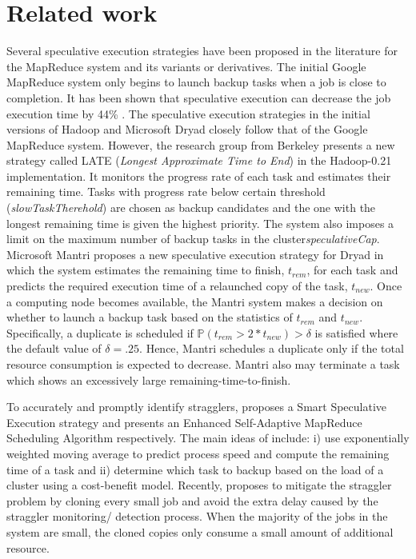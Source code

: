 \documentclass[10pt,conference]{IEEEtran}
\begin{document}
\section{Related work}
\label{related_work}
Several speculative execution strategies have been proposed in the literature for the MapReduce system and its variants or derivatives. The initial Google MapReduce system only begins to launch backup tasks  when a job is close to completion. It has been shown that speculative execution can decrease the job execution time by 44\% {\cite{mapreduce:google}}.
The speculative execution strategies in the initial versions of  Hadoop {\cite{hadoop}} and Microsoft Dryad {\cite{Dryad}} closely follow that of the Google MapReduce system. However, the research group from Berkeley presents a new strategy called LATE (\emph{Longest Approximate Time to End}) {\cite{Performance}} in the Hadoop-0.21 implementation. It monitors the progress rate of each task and estimates their remaining time. Tasks with progress rate below certain threshold (\textit{slowTaskTherehold}) are chosen as backup candidates and the one with the longest remaining time is given the highest priority.  The system also imposes a limit on the maximum  number of backup tasks in the cluster\textit{speculativeCap}. Microsoft Mantri {\cite{Outliers}} proposes a new speculative execution strategy for Dryad in which the system estimates  the remaining time to finish, $t_{rem}$, for each task and predicts the required execution time of a relaunched copy of the task, $t_{new}$. Once a computing node becomes available, the Mantri system makes a decision on whether to launch a backup task based on the statistics of $t_{rem}$ and $t_{new}$. Specifically, a duplicate is scheduled if $\mathbb{P}(t_{rem}>2*t_{new}) > \delta$ is satisfied where
 the default value of $\delta = .25$. Hence, Mantri schedules a duplicate only if the total resource consumption is expected to decrease. Mantri also may terminate a task which shows an excessively large remaining-time-to-finish.

To accurately and promptly identify stragglers, {\cite{Smart_Speculative}} proposes a Smart Speculative Execution strategy and {\cite{ESAMR}} presents an Enhanced Self-Adaptive MapReduce Scheduling Algorithm respectively. The main ideas of {\cite{Smart_Speculative}} include: i) use exponentially weighted moving average to predict process speed and compute the remaining time of a task and  ii) determine which task to backup based on the load of a cluster using a cost-benefit model. Recently, {\cite{Cloning}} proposes  to mitigate the straggler problem by cloning every small job and avoid the extra delay caused by the straggler monitoring/ detection process.
When the majority of the jobs in the system are small, the cloned copies only consume a small amount of additional resource.
\end{document}
